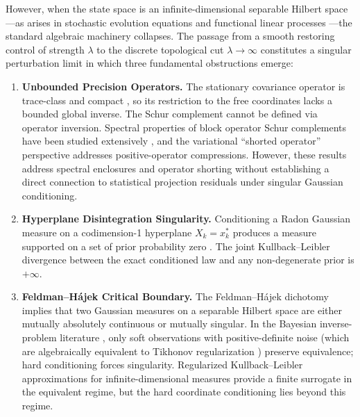 \documentclass[11pt]{amsart}
\theoremstyle{plain}
\theoremstyle{definition}
\theoremstyle{remark}
\begin{document}
However, when the state space is an infinite-dimensional separable Hilbert space---as arises in stochastic evolution equations \cite{daprato2014stochastic} and functional linear processes \cite{bosq2000linear}---the standard algebraic machinery collapses. The passage from a smooth restoring control of strength $\lambda$ to the discrete topological cut $\lambda \to \infty$ constitutes a singular perturbation limit \cite{pavliotis2008multiscale} in which three fundamental obstructions emerge:
\begin{enumerate}
  \item \textbf{Unbounded Precision Operators.} The stationary covariance operator is trace-class and compact \cite{daprato2014stochastic}, so its restriction to the free coordinates lacks a bounded global inverse. The Schur complement cannot be defined via operator inversion. Spectral properties of block operator Schur complements have been studied extensively \cite{tretter2008spectral,gerhat2024schur}, and the variational ``shorted operator'' perspective \cite{anderson1975shorted} addresses positive-operator compressions. However, these results address spectral enclosures and operator shorting without establishing a direct connection to statistical projection residuals under singular Gaussian conditioning.
  \item \textbf{Hyperplane Disintegration Singularity.} Conditioning a Radon Gaussian measure on a codimension-1 hyperplane $X_k = x_k^*$ produces a measure supported on a set of prior probability zero \cite{bogachev1998gaussian}. The joint Kullback--Leibler divergence between the exact conditioned law and any non-degenerate prior is $+\infty$.
  \item \textbf{Feldman--H\'{a}jek Critical Boundary.} The Feldman--H\'{a}jek dichotomy \cite{feldman1958equivalence,hajek1958property,bogachev1998gaussian} implies that two Gaussian measures on a separable Hilbert space are either mutually absolutely continuous or mutually singular. In the Bayesian inverse-problem literature \cite{stuart2010inverse}, only soft observations with positive-definite noise (which are algebraically equivalent to Tikhonov regularization \cite{franklin1970well}) preserve equivalence; hard conditioning forces singularity. Regularized Kullback--Leibler approximations for infinite-dimensional measures \cite{pinski2015kullback} provide a finite surrogate in the equivalent regime, but the hard coordinate conditioning lies beyond this regime.
\end{enumerate}
\end{document}
